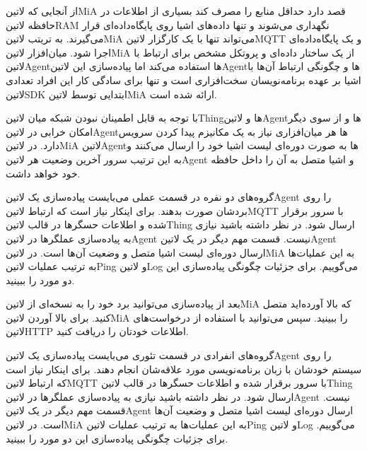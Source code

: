 \documentclass[]{assignment}
\begin{document}
از آنجایی که ‌لاتین{MiA} قصد دارد حداقل منابع را مصرف کند بسیاری از اطلاعات در حافظه ‌لاتین{RAM} نگهداری می‌شوند و تنها داده‌های اشیا روی پایگاه‌داده‌ای قرار می‌گیرند.
به تریتب ‌لاتین{MiA} می‌تواند تنها با یک کارگزار ‌لاتین{MQTT} و یک پایگاه‌داده‌ای اجرا شود.
میان‌افزار ‌لاتین{MiA} از یک ساختار داده‌ای و پروتکل مشخص برای ارتباط با ‌لاتین{Agent}ها استفاده می‌کند اما پیاده‌سازی این ‌لاتین{Agent}ها و چگونگی ارتباط آن‌ها با
اشیا بر عهده برنامه‌نویسان سخت‌افزاری است و تنها برای سادگی کار این افراد تعدادی ‌لاتین{SDK} ابتدایی توسط ‌لاتین{MiA} ارائه شده است.

با توجه به قابل اطمینان نبودن شبکه میان ‌لاتین{Thing}ها و ‌لاتین{Agent}ها و از سوی دیگر امکان خرابی در ‌لاتین{Agent}ها هر میان‌افزاری نیاز به یک مکانیزم پیدا کردن سرویس
دارد. در ‌لاتین{MiA} ‌لاتین{Agent}ها به صورت دوره‌ای لیست اشیا خود را ارسال می‌کنند و به این ترتیب سرور آخرین وضعیت هر ‌لاتین{Agent} و اشیا متصل به آن را داخل حافظه خود خواهد داشت.


 
 


گروه‌های دو نفره در قسمت عملی می‌بایست پیاده‌سازی یک ‌لاتین{Agent} را روی بردشان صورت بدهند.
برای اینکار نیاز است که ارتباط ‌لاتین{MQTT}
با سرور برقرار شده و اطلاعات حسگرها در قالب ‌لاتین{Thing} ارسال شود. در نظر داشته باشید نیازی به پیاده‌سازی عملگرها در ‌لاتین{Agent} نیست.
قسمت مهم دیگر در یک ‌لاتین{Agent} ارسال دوره‌ای لیست اشیا متصل و وضعیت آن‌ها است. در ‌لاتین{MiA} به این عملیات‌ها به ترتیب عملیات
‌لاتین{Ping} و ‌لاتین{Log} می‌گوییم. برای جزئیات چگونگی پیاده‌سازی این دو مورد  را ببینید.

بعد از پیاده‌سازی می‌توانید برد خود را به نسخه‌ای از ‌لاتین{MiA} که بالا آورده‌اید متصل کنید.
برای بالا آوردن ‌لاتین{MiA}  را ببینید.
سپس می‌توانید با استفاده از درخواست‌های ‌لاتین{HTTP} اطلاعات خودتان را دریافت کنید.



گروه‌های انفرادی در قسمت تئوری می‌بایست پیاده‌سازی یک ‌لاتین{Agent} را روی سیستم خودشان با زبان برنامه‌نویسی مورد علاقه‌شان انجام دهند.
برای اینکار نیاز است که ارتباط ‌لاتین{MQTT}
با سرور برقرار شده و اطلاعات حسگرها در قالب ‌لاتین{Thing} ارسال شود. در نظر داشته باشید نیازی به پیاده‌سازی عملگرها در ‌لاتین{Agent} نیست.
قسمت مهم دیگر در یک ‌لاتین{Agent} ارسال دوره‌ای لیست اشیا متصل و وضعیت آن‌ها است. در ‌لاتین{MiA} به این عملیات‌ها به ترتیب عملیات
‌لاتین{Ping} و ‌لاتین{Log} می‌گوییم. برای جزئیات چگونگی پیاده‌سازی این دو مورد  را ببینید.
\end{document}
